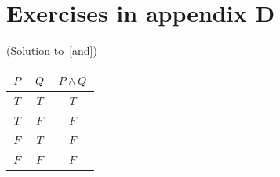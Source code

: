 \section{Exercises in appendix D}

\begin{prf}\label{sol_and}(Solution to~\ref{and})
 \begin{center}
  \begin{tabular}{|c|c||c|}\hline
        \,$P$\,    &    \,$Q$\,    &   \,$P \land Q$\,   \\
    \hline\hline
          $T$      &      $T$      &     $T$            \\
    \hline
          $T$      &      $F$      &     $F$            \\
    \hline
          $F$      &      $T$      &     $F$            \\
    \hline
          $F$      &      $F$      &     $F$            \\
    \hline
  \end{tabular}
 \end{center}
\end{prf}

